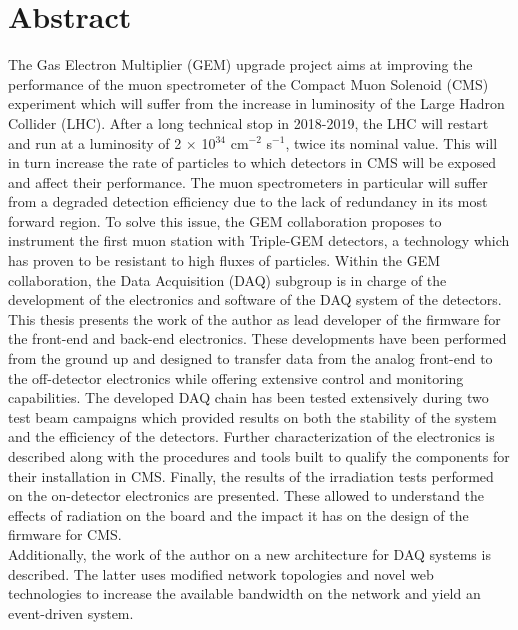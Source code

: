 \chapter*{Abstract}

  The Gas Electron Multiplier (GEM) upgrade project aims at improving the performance of the muon spectrometer of the Compact Muon Solenoid (CMS) experiment which will suffer from the increase in luminosity of the Large Hadron Collider (LHC). After a long technical stop in 2018-2019, the LHC will restart and run at a luminosity of 2 $\times$ 10$^{34}$ cm$^{-2}$ s$^{-1}$, twice its nominal value. This will in turn increase the rate of particles to which detectors in CMS will be exposed and affect their performance. The muon spectrometers in particular will suffer from a degraded detection efficiency due to the lack of redundancy in its most forward region. To solve this issue, the GEM collaboration proposes to instrument the first muon station with Triple-GEM detectors, a technology which has proven to be resistant to high fluxes of particles. Within the GEM collaboration, the Data Acquisition (DAQ) subgroup is in charge of the development of the electronics and software of the DAQ system of the detectors. \\

  This thesis presents the work of the author as lead developer of the firmware for the front-end and back-end electronics. These developments have been performed from the ground up and designed to transfer data from the analog front-end to the off-detector electronics while offering extensive control and monitoring capabilities. The developed DAQ chain has been tested extensively during two test beam campaigns which provided results on both the stability of the system and the efficiency of the detectors. Further characterization of the electronics is described along with the procedures and tools built to qualify the components for their installation in CMS. Finally, the results of the irradiation tests performed on the on-detector electronics are presented. These allowed to understand the effects of radiation on the board and the impact it has on the design of the firmware for CMS. \\

  Additionally, the work of the author on a new architecture for DAQ systems is described. The latter uses modified network topologies and novel web technologies to increase the available bandwidth on the network and yield an event-driven system.
